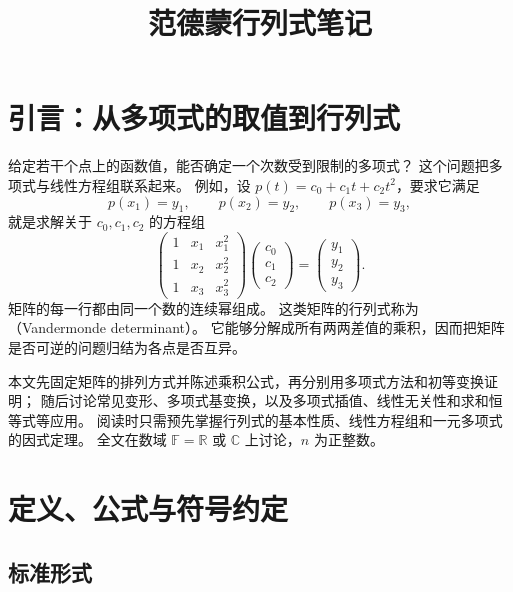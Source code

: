 \documentclass[UTF8,12pt,a4paper,fontset=fandol]{ctexart}
\title{范德蒙行列式笔记}
\author{}
\date{}
\begin{document}
\maketitle
\tableofcontents

\section{引言：从多项式的取值到行列式}

给定若干个点上的函数值，能否确定一个次数受到限制的多项式？
这个问题把多项式与线性方程组联系起来。
例如，设 $p(t)=c_0+c_1t+c_2t^2$，要求它满足
\[
  p(x_1)=y_1,\qquad p(x_2)=y_2,\qquad p(x_3)=y_3,
\]
就是求解关于 $c_0,c_1,c_2$ 的方程组
\[
  \begin{pmatrix}
    1&x_1&x_1^2\\
    1&x_2&x_2^2\\
    1&x_3&x_3^2
  \end{pmatrix}
  \begin{pmatrix}c_0\\c_1\\c_2\end{pmatrix}
  =\begin{pmatrix}y_1\\y_2\\y_3\end{pmatrix}.
\]
矩阵的每一行都由同一个数的连续幂组成。
这类矩阵的行列式称为（Vandermonde determinant）。
它能够分解成所有两两差值的乘积，因而把矩阵是否可逆的问题归结为各点是否互异。

本文先固定矩阵的排列方式并陈述乘积公式，再分别用多项式方法和初等变换证明；
随后讨论常见变形、多项式基变换，以及多项式插值、线性无关性和求和恒等式等应用。
阅读时只需预先掌握行列式的基本性质、线性方程组和一元多项式的因式定理。
全文在数域 $\mathbb F=\mathbb R$ 或 $\mathbb C$ 上讨论，$n$ 为正整数。

\section{定义、公式与符号约定}

\subsection{标准形式}
\end{document}
